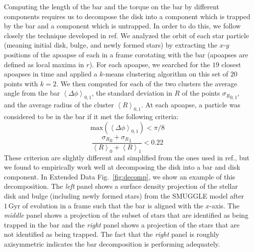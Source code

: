 \documentclass{natureprintstyle}
\begin{document}
Computing the length of the bar and the torque on the bar by different
components requires us to decompose the disk into a component which is trapped
by the bar and a component which is untrapped. In order to do this, we follow
closely the technique developed in ref.\cite{2016MNRAS.463.1952P} We analyzed
the orbit of each star particle (meaning initial disk, bulge, and newly formed
stars) by extracting the $x$-$y$ positions of the apoapse of each in a frame
corotating with the bar (apoapses are defined as local maxima in $r$). For
each apoapse, we searched for the $19$ closest apoapses in time and applied a
$k$-means clustering algorithm on this set of $20$ points with $k=2$. We then
computed for each of the two clusters the average angle from the bar
$\left<\Delta \phi\right>_{0,1}$, the standard deviation in $R$ of the points
${\sigma_R}_{0,1}$, and the average radius of the cluster
$\left<R\right>_{0,1}$. At each apoapse, a particle was considered to be in
the bar if it met the following criteria:
\begin{equation}
\textrm{max}\left(\left<\Delta \phi\right>_{0,1}\right) < \pi / 8
\end{equation}
\begin{equation}
\frac{{\sigma_R}_0 + {\sigma_R}_1}{\left<R\right>_0 + \left<R\right>_1} < 0.22
\end{equation}
These criterion are slightly different and simplified from the ones used in
ref.\cite{2016MNRAS.463.1952P}, but we found to empirically work well at
decomposing the disk into a bar and disk component. In Extended Data
Fig.~\ref{fig:decomp}, we show an example of this decomposition. The
\textit{left} panel shows a surface density projection of the stellar disk and
bulge (including newly formed stars) from the SMUGGLE model after
$1\,\text{Gyr}$ of evolution in a frame such that the bar is aligned with the
$x$-axis. The \textit{middle} panel shows a projection of the subset of stars
that are identified as being trapped in the bar and the \textit{right} panel
shows a projection of the stars that are not identified as being trapped. The
fact that the \textit{right} panel is roughly axisymmetric indicates the bar
decomposition is performing adequately.
\end{document}

